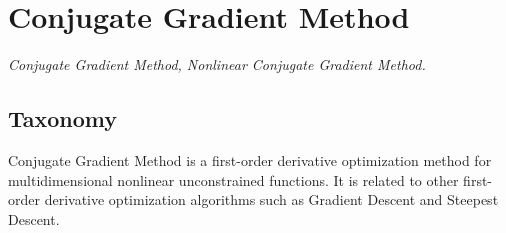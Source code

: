 
\section{Conjugate Gradient Method} 
\label{sec:conjugate_gradient}

\emph{Conjugate Gradient Method, Nonlinear Conjugate Gradient Method.}

\subsection{Taxonomy}
Conjugate Gradient Method is a first-order derivative optimization method for multidimensional nonlinear unconstrained functions.
It is related to other first-order derivative optimization algorithms such as Gradient Descent and Steepest Descent.

